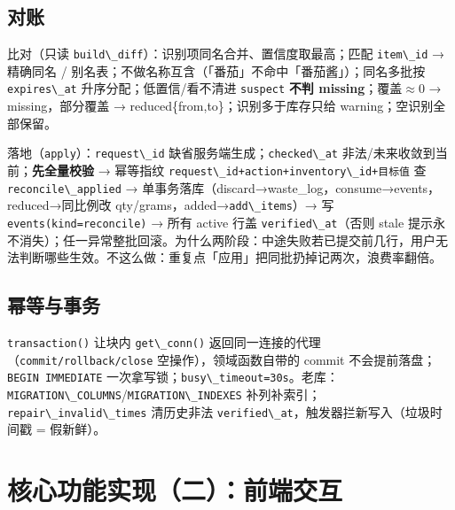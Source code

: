 \subsection{对账}\label{ux5bf9ux8d26}

比对（只读
\passthrough{\lstinline!build\_diff!}）：识别项同名合并、置信度取最高；匹配
\passthrough{\lstinline!item\_id!} → 精确同名 /
别名表；不做名称互含（「番茄」不命中「番茄酱」）；同名多批按
\passthrough{\lstinline!expires\_at!} 升序分配；低置信/看不清进
\passthrough{\lstinline!suspect!} \textbf{不判 missing}；覆盖\ensuremath{\approx}0 →
missing，部分覆盖 → reduced\{from,to\}；识别多于库存只给
warning；空识别全部保留。

落地（\passthrough{\lstinline!apply!}）：\passthrough{\lstinline!request\_id!}
缺省服务端生成；\passthrough{\lstinline!checked\_at!}
非法/未来收敛到当前；\textbf{先全量校验} → 幂等指纹
\passthrough{\lstinline!request\_id+action+inventory\_id+目标值!} 查
\passthrough{\lstinline!reconcile\_applied!} →
单事务落库（discard→waste\_log，consume→events，reduced→同比例改
qty/grams，added→\passthrough{\lstinline!add\_items!}）→ 写
\passthrough{\lstinline!events(kind=reconcile)!} → 所有 active 行盖
\passthrough{\lstinline!verified\_at!}（否则 stale
提示永不消失）；任一异常整批回滚。为什么两阶段：中途失败若已提交前几行，用户无法判断哪些生效。不这么做：重复点「应用」把同批扔掉记两次，浪费率翻倍。

\subsection{幂等与事务}\label{ux5e42ux7b49ux4e0eux4e8bux52a1}

\passthrough{\lstinline!transaction()!} 让块内
\passthrough{\lstinline!get\_conn()!}
返回同一连接的代理（\passthrough{\lstinline!commit/rollback/close!}
空操作），领域函数自带的 commit
不会提前落盘；\passthrough{\lstinline!BEGIN IMMEDIATE!}
一次拿写锁；\passthrough{\lstinline!busy\_timeout=30s!}。老库：\passthrough{\lstinline!MIGRATION\_COLUMNS!}/\passthrough{\lstinline!MIGRATION\_INDEXES!}
补列补索引；\passthrough{\lstinline!repair\_invalid\_times!} 清历史非法
\passthrough{\lstinline!verified\_at!}，触发器拦新写入（垃圾时间戳 =
假新鲜）。

\section{核心功能实现（二）：前端交互}\label{ux524dux7aefux5de5ux7a0b}

